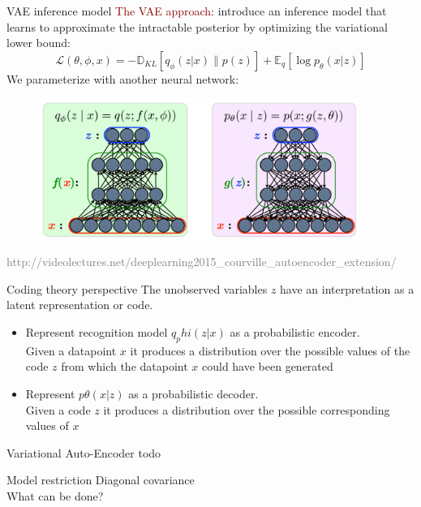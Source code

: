 \documentclass[unicode,11pt]{beamer}
\begin{document}

\begin{frame}[fragile]{VAE inference model}
\textcolor{darkred}{The VAE approach}: introduce an inference model that
learns to approximate the intractable posterior by
optimizing the variational lower bound: 
$$ \mathcal{L}(\theta, \phi, x) = -\mathbb{D}_{KL}[q_{\phi} (z|x) \parallel p(z)] + \mathbb{E}_q [\log p_\theta (x|z)] $$
We parameterize with another neural network:
\begin{figure}[htbp]
  \includegraphics[height=130pt, keepaspectratio = true]{images/vae}   
\end{figure}
\tiny \textcolor{gray}{http://videolectures.net/deeplearning2015\_courville\_autoencoder\_extension/}
\end{frame}

\begin{frame}[fragile]{Coding theory perspective}
The unobserved variables $z$ have an interpretation as a latent representation or code.

\begin{itemize}
  \item Represent recognition model $q_phi(z|x)$ as a probabilistic encoder.\\
        Given a datapoint $x$ it produces a distribution over the possible values of the code $z$ from which the datapoint $x$ could have been generated
  \item Represent $p\theta(x|z)$ as a probabilistic decoder.\\
        Given a code $z$ it produces a distribution over the possible corresponding values of $x$
\end{itemize}
\end{frame}

\begin{frame}[fragile]{Variational Auto-Encoder}
todo 
\end{frame}


\begin{frame}[fragile]{Model restriction}
Diagonal covariance\\
\vspace{5mm}
What can be done?
\end{frame}
\end{document}
